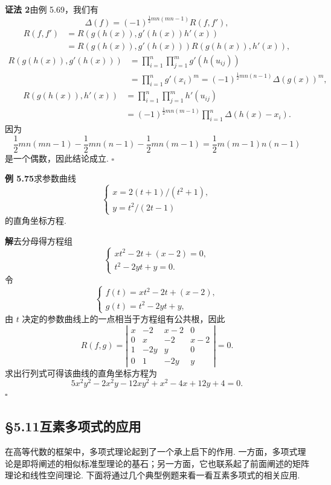 \documentclass[UTF8, 12pt, fontset=fandol, oneside]{ctexart}
\begin{document}
\noindent\textbf{证法 2}\quad 由例 5.69，我们有
\[
\Delta(f)=(-1)^{\frac12 mn(mn-1)}R(f,f'),
\]
\[
\begin{aligned}
R(f,f')
&=R(g(h(x)),g'(h(x))h'(x))\\
&=R(g(h(x)),g'(h(x)))R(g(h(x)),h'(x)),
\end{aligned}
\]
\[
\begin{aligned}
R(g(h(x)),g'(h(x)))
&=\prod_{i=1}^n\prod_{j=1}^m g'(h(u_{ij}))\\
&=\prod_{i=1}^n g'(x_i)^m
=(-1)^{\frac12 mn(n-1)}\Delta(g(x))^m,
\end{aligned}
\]
\[
\begin{aligned}
R(g(h(x)),h'(x))
&=\prod_{i=1}^n\prod_{j=1}^m h'(u_{ij})\\
&=(-1)^{\frac12 mn(m-1)}\prod_{i=1}^n\Delta(h(x)-x_i).
\end{aligned}
\]
因为
\[
\frac12 mn(mn-1)-\frac12 mn(n-1)-\frac12 mn(m-1)=\frac12 m(m-1)n(n-1)
\]
是一个偶数，因此结论成立. \hfill $\square$

\noindent\textbf{例 5.75}\quad 求参数曲线
\[
\left\{
\begin{array}{l}
x=2(t+1)/(t^2+1),\\
y=t^2/(2t-1)
\end{array}
\right.
\]
的直角坐标方程.

\noindent\textbf{解}\quad 去分母得方程组
\[
\left\{
\begin{array}{l}
xt^2-2t+(x-2)=0,\\
t^2-2yt+y=0.
\end{array}
\right.
\]
令
\[
\left\{
\begin{array}{l}
f(t)=xt^2-2t+(x-2),\\
g(t)=t^2-2yt+y,
\end{array}
\right.
\]
由 $t$ 决定的参数曲线上的一点相当于方程组有公共根，因此
\[
R(f,g)=
\left|\begin{array}{cccc}
x & -2 & x-2 & 0\\
0 & x & -2 & x-2\\
1 & -2y & y & 0\\
0 & 1 & -2y & y
\end{array}\right|=0.
\]
求出行列式可得该曲线的直角坐标方程为
\[
5x^2y^2-2x^2y-12xy^2+x^2-4x+12y+4=0.
\]
\hfill $\square$

\subsection*{§5.11\quad 互素多项式的应用}

在高等代数的框架中，多项式理论起到了一个承上启下的作用. 一方面，多项式理论是即将阐述的相似标准型理论的基石；另一方面，它也联系起了前面阐述的矩阵理论和线性空间理论. 下面将通过几个典型例题来看一看互素多项式的相关应用.
\end{document}
